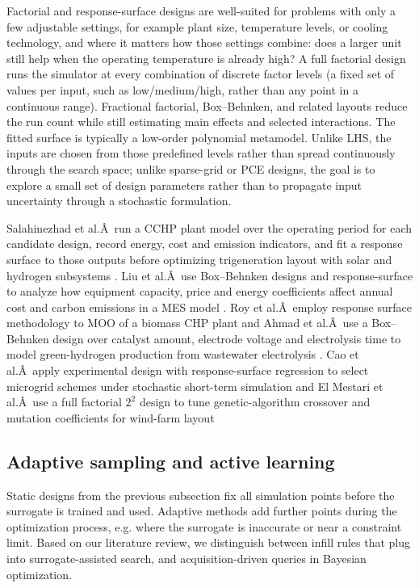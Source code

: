 \documentclass[final,5p,times,twocolumn]{elsarticle}
\begin{document}
Factorial and response-surface designs are well-suited for problems with
only a few adjustable settings, for example plant size, temperature
levels, or cooling technology, and where it matters how those settings
combine: does a larger unit still help when the operating temperature is
already high? A full factorial design runs the simulator at every
combination of discrete factor levels (a fixed set of values per input,
such as low/medium/high, rather than any point in a continuous range).
Fractional factorial, Box--Behnken, and related layouts reduce the run
count while still estimating main effects and selected interactions. The
fitted surface is typically a low-order polynomial metamodel. Unlike
LHS, the inputs are chosen from those predefined levels rather than
spread continuously through the search space; unlike sparse-grid or PCE
designs, the goal is to explore a small set of design parameters rather
than to propagate input uncertainty through a stochastic formulation.

Salahinezhad et al.Â~run a CCHP plant model over the operating period for
each candidate design, record energy, cost and emission indicators, and
fit a response surface to those outputs before optimizing trigeneration
layout with solar and hydrogen subsystems \cite{Salahinezhad2025}. Liu et
al.Â~use Box--Behnken designs and response-surface to analyze how
equipment capacity, price and energy coefficients affect annual cost and
carbon emissions in a MES model \cite{Liu2025__4}. Roy et al.Â~employ
response surface methodology to MOO of a biomass CHP plant \cite{Roy2023}
and Ahmad et al.Â~use a Box--Behnken design over catalyst amount,
electrode voltage and electrolysis time to model green-hydrogen
production from wastewater electrolysis \cite{Ahmad202451}. Cao et al.Â~apply
experimental design with response-surface regression to select microgrid
schemes under stochastic short-term simulation \cite{Cao2017} and El Mestari
et al.Â~use a full factorial $2^2$ design to tune genetic-algorithm
crossover and mutation coefficients for wind-farm layout
\cite{El Mestari2025}

\subsection{Adaptive sampling and active learning}
\label{sec:doe:adaptive}

Static designs from the previous subsection fix all simulation points
before the surrogate is trained and used. Adaptive methods add further
points during the optimization process, e.g. where the surrogate is
inaccurate or near a constraint limit. Based on our literature review,
we distinguish between infill rules that plug into surrogate-assisted
search, and acquisition-driven queries in Bayesian optimization.
\end{document}
